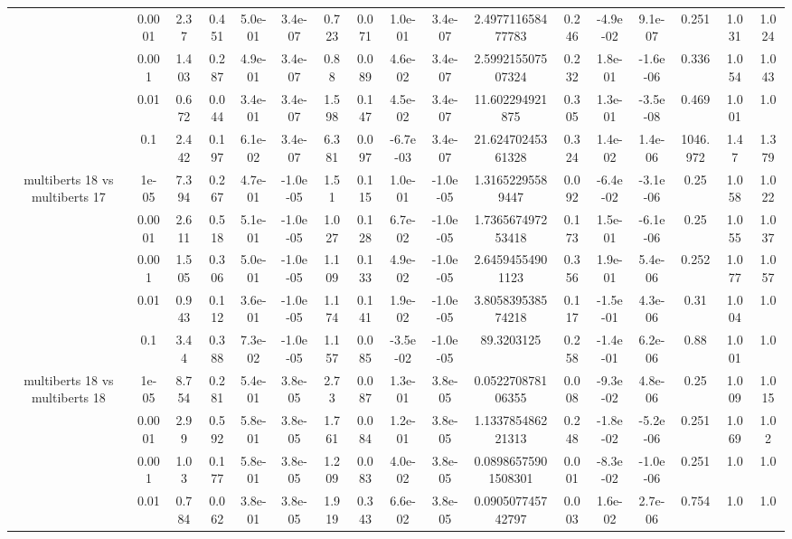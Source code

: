 \begin{tabular}{|c|c|c|c|c|c|c|c|c|c|c|c|c|c|c|c|c|}
 & 0.0001 & 2.37 & 0.451 & 5.0e-01 & 3.4e-07 & 0.723 & 0.071 & 1.0e-01 & 3.4e-07 & 2.497711658477783 & 0.246 & -4.9e-02 & 9.1e-07 & 0.251 & 1.031 & 1.024 \\
 & 0.001 & 1.403 & 0.287 & 4.9e-01 & 3.4e-07 & 0.88 & 0.089 & 4.6e-02 & 3.4e-07 & 2.599215507507324 & 0.232 & 1.8e-01 & -1.6e-06 & 0.336 & 1.054 & 1.043 \\
 & 0.01 & 0.672 & 0.044 & 3.4e-01 & 3.4e-07 & 1.598 & 0.147 & 4.5e-02 & 3.4e-07 & 11.602294921875 & 0.305 & 1.3e-01 & -3.5e-08 & 0.469 & 1.001 & 1.0 \\
 & 0.1 & 2.442 & 0.197 & 6.1e-02 & 3.4e-07 & 6.381 & 0.097 & -6.7e-03 & 3.4e-07 & 21.62470245361328 & 0.324 & 1.4e-02 & 1.4e-06 & 1046.972 & 1.47 & 1.379 \\
\hline
\multirow{5}{*}{multiberts 18 vs multiberts 17} & 1e-05 & 7.394 & 0.267 & 4.7e-01 & -1.0e-05 & 1.51 & 0.115 & 1.0e-01 & -1.0e-05 & 1.31652295589447 & 0.092 & -6.4e-02 & -3.1e-06 & 0.25 & 1.058 & 1.022 \\
 & 0.0001 & 2.611 & 0.518 & 5.1e-01 & -1.0e-05 & 1.027 & 0.128 & 6.7e-02 & -1.0e-05 & 1.736567497253418 & 0.173 & 1.5e-01 & -6.1e-06 & 0.25 & 1.055 & 1.037 \\
 & 0.001 & 1.505 & 0.306 & 5.0e-01 & -1.0e-05 & 1.109 & 0.133 & 4.9e-02 & -1.0e-05 & 2.64594554901123 & 0.356 & 1.9e-01 & 5.4e-06 & 0.252 & 1.077 & 1.057 \\
 & 0.01 & 0.943 & 0.112 & 3.6e-01 & -1.0e-05 & 1.174 & 0.141 & 1.9e-02 & -1.0e-05 & 3.805839538574218 & 0.117 & -1.5e-01 & 4.3e-06 & 0.31 & 1.004 & 1.0 \\
 & 0.1 & 3.44 & 0.388 & 7.3e-02 & -1.0e-05 & 1.157 & 0.085 & -3.5e-02 & -1.0e-05 & 89.3203125 & 0.258 & -1.4e-01 & 6.2e-06 & 0.88 & 1.001 & 1.0 \\
\hline
\multirow{5}{*}{multiberts 18 vs multiberts 18} & 1e-05 & 8.754 & 0.281 & 5.4e-01 & 3.8e-05 & 2.73 & 0.087 & 1.3e-01 & 3.8e-05 & 0.052270878106355 & 0.008 & -9.3e-02 & 4.8e-06 & 0.25 & 1.009 & 1.015 \\
 & 0.0001 & 2.99 & 0.592 & 5.8e-01 & 3.8e-05 & 1.761 & 0.084 & 1.2e-01 & 3.8e-05 & 1.133785486221313 & 0.248 & -1.8e-02 & -5.2e-06 & 0.251 & 1.069 & 1.02 \\
 & 0.001 & 1.03 & 0.177 & 5.8e-01 & 3.8e-05 & 1.209 & 0.083 & 4.0e-02 & 3.8e-05 & 0.08986575901508301 & 0.001 & -8.3e-02 & -1.0e-06 & 0.251 & 1.0 & 1.0 \\
 & 0.01 & 0.784 & 0.062 & 3.8e-01 & 3.8e-05 & 1.919 & 0.343 & 6.6e-02 & 3.8e-05 & 0.090507745742797 & 0.003 & 1.6e-02 & 2.7e-06 & 0.754 & 1.0 & 1.0 \\

\end{tabular}
